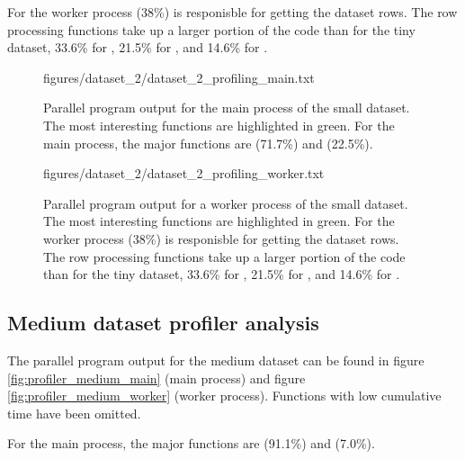 For the worker process  (38\%) is responisble for getting the dataset rows. The row processing functions take up a larger portion of the code
than for the tiny dataset, 33.6\% for , 21.5\% for , and 14.6\% for .

\begin{figure}[ht]
  \begin{VerbatimInput}{figures/dataset_2/dataset_2_profiling_main.txt}
    \caption[Parallel program  output for the main process of the small dataset.]{Parallel program  output for the main process of the small dataset.
    The most interesting functions are highlighted in green.
  For the main process, the major functions are  (71.7\%) and  (22.5\%).}
  \label{fig:profiler_small_main}
\end{VerbatimInput}
\end{figure}

\begin{figure}[ht]
  \begin{VerbatimInput}{figures/dataset_2/dataset_2_profiling_worker.txt}
    \caption[Parallel program  output for a worker process of the small dataset.]{Parallel program  output for a worker process of the small dataset.
    The most interesting functions are highlighted in green.
  For the worker process  (38\%) is responisble for getting the dataset rows. The row processing functions take up a larger portion of the code
than for the tiny dataset, 33.6\% for , 21.5\% for , and 14.6\% for .}
  \label{fig:profiler_small_worker}
\end{VerbatimInput}
\end{figure}

\subsection{Medium dataset profiler analysis}
The parallel program  output for the medium dataset can be found in figure \ref{fig:profiler_medium_main} (main process) and figure \ref{fig:profiler_medium_worker}
(worker process). Functions with low cumulative time have been omitted.

For the main process, the major functions are  (91.1\%) and  (7.0\%).

